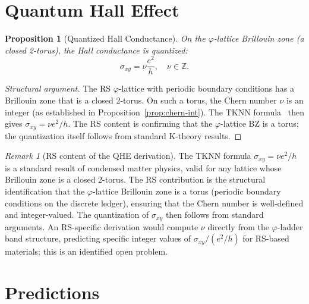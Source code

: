 \documentclass[12pt,a4paper]{article}
\newtheorem{proposition}[theorem]{Proposition}
\theoremstyle{definition}
\theoremstyle{remark}
\newtheorem{remark}[theorem]{Remark}
\begin{document}
\section{Quantum Hall Effect}
\label{sec:qhe}

\begin{proposition}[Quantized Hall Conductance]
\label{prop:qhe}
On the $\varphi$-lattice Brillouin zone (a closed 2-torus), the
Hall conductance is quantized:
\begin{equation}
  \sigma_{xy} = \nu \frac{e^2}{h},
  \quad \nu \in \mathbb{Z}.
\end{equation}
\end{proposition}

\begin{proof}[Structural argument]
The RS $\varphi$-lattice with periodic boundary conditions has a
Brillouin zone that is a closed 2-torus.  On such a torus, the
Chern number $\nu$ is an integer (as established in
Proposition~\ref{prop:chern-int}).  The TKNN formula~\cite{Thouless1982}
then gives $\sigma_{xy} = \nu e^2/h$.  The RS content is confirming
that the $\varphi$-lattice BZ is a torus; the quantization itself
follows from standard K-theory results.
\end{proof}

\begin{remark}[RS content of the QHE derivation]
The TKNN formula $\sigma_{xy} = \nu e^2/h$ is a standard result of
condensed matter physics, valid for any lattice whose Brillouin zone
is a closed 2-torus.  The RS contribution is the structural
identification that the $\varphi$-lattice Brillouin zone is a torus
(periodic boundary conditions on the discrete ledger), ensuring that
the Chern number is well-defined and integer-valued.  The quantization
of $\sigma_{xy}$ then follows from standard arguments.  An RS-specific
derivation would compute $\nu$ directly from the $\varphi$-ladder band
structure, predicting specific integer values of $\sigma_{xy}/(e^2/h)$
for RS-based materials; this is an identified open problem.
\end{remark}

\section{Predictions}
\label{sec:predictions}
\end{document}
